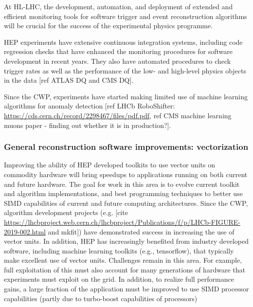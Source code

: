 \documentclass[10pt,a4paper]{article}
\begin{document}
At HL-LHC, the development, automation, and deployment of extended and
efficient monitoring tools for software trigger and event reconstruction
algorithms will be crucial for the success of the experimental physics
programme.

HEP experiments have extensive continuous integration systems, including
code regression checks that have enhanced the monitoring procedures for
software development in recent years. They also have automated
procedures to check trigger rates as well as the performance of the low-
and high-level physics objects in the data {[}ref ATLAS DQ and CMS
DQ{]}.

Since the CWP, experiments have started making limited use of machine
learning algorithms for anomaly detection {[}ref LHCb RoboShifter:
\href{https://cds.cern.ch/record/2298467/files/pdf.pdf}{{https://cds.cern.ch/record/2298467/files/pdf.pdf}},
ref CMS machine learning muons paper - finding out whether it is in
production?{]}.

\hypertarget{general-reconstruction-software-improvements-vectorization}{%
\subsubsection{General reconstruction software improvements:
vectorization}\label{general-reconstruction-software-improvements-vectorization}}

Improving the ability of HEP developed toolkits to use vector units on
commodity hardware will bring speedups to applications running on both
current and future hardware. The goal for work in this area is to evolve
current toolkit and algorithm implementations, and best programming
techniques to better use SIMD capabilities of current and future
computing architectures. Since the CWP, algorithm development projects
(e.g. {[}cite
\url{https://lhcbproject.web.cern.ch/lhcbproject/Publications/f/p/LHCb-FIGURE-2019-002.html}
and mkfit{]}) have demonstrated success in increasing the use of vector
units. In addition, HEP has increasingly benefited from industry
developed software, including machine learning toolkits (e.g.,
tensorflow), that typically make excellent use of vector units.
Challenges remain in this area. For example, full exploitation of this
must also account for many generations of hardware that experiments must
exploit on the grid. In addition, to realize full performance gains, a
large fraction of the application must be improved to use SIMD processor
capabilities (partly due to turbo-boost capabilities of processors)
\end{document}

